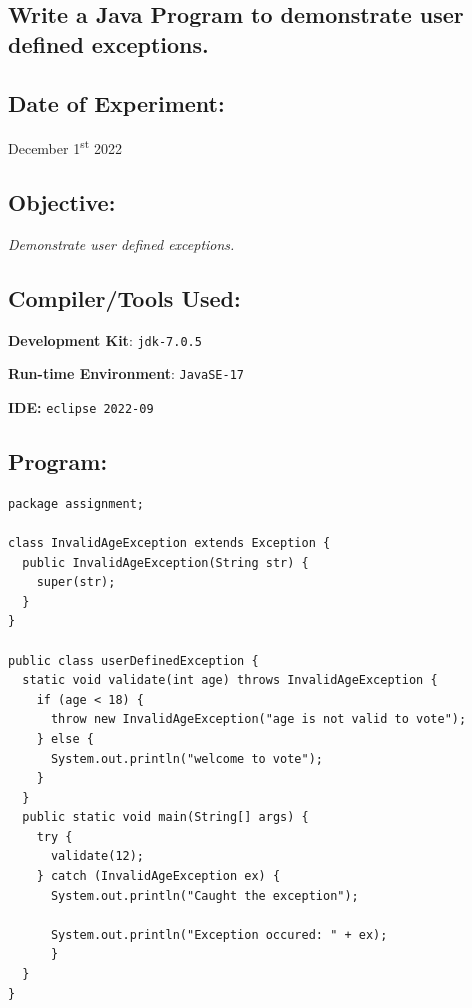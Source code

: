 \documentclass[12pt, a4paper]{article}
\begin{document}
\begin{tcolorbox}
\section{Write a Java Program to demonstrate user defined exceptions.}
\end{tcolorbox}
\subsection*{Date of Experiment:}
December 1\textsuperscript{st} 2022

\subsection*{Objective:}
\emph{\large{Demonstrate user defined exceptions.}}

\subsection*{Compiler/Tools Used:}
\textbf{Development Kit}: \verb+jdk-7.0.5+

\textbf{Run-time Environment}: \verb+JavaSE-17+

\textbf{IDE:} \verb+eclipse 2022-09+

\subsection*{Program:}
\begin{lstlisting}
package assignment;

class InvalidAgeException extends Exception {
  public InvalidAgeException(String str) {
    super(str);
  }
}

public class userDefinedException {
  static void validate(int age) throws InvalidAgeException {
    if (age < 18) {
      throw new InvalidAgeException("age is not valid to vote");
    } else {
      System.out.println("welcome to vote");
    }
  }
  public static void main(String[] args) {
    try {
      validate(12);
    } catch (InvalidAgeException ex) {
      System.out.println("Caught the exception");

      System.out.println("Exception occured: " + ex);
      }
  }
}
\end{lstlisting}
\end{document}
